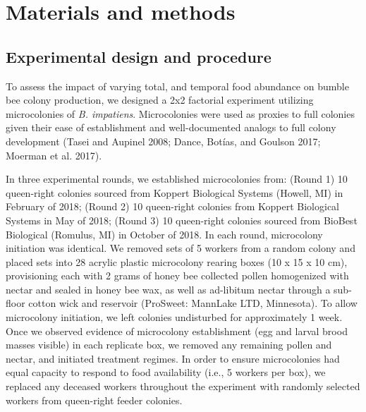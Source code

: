 \documentclass[11pt,]{article}
\begin{document}
\hypertarget{materials-and-methods}{%
\section{Materials and methods}\label{materials-and-methods}}

\hypertarget{experimental-design-and-procedure}{%
\subsection{Experimental design and
procedure}\label{experimental-design-and-procedure}}

To assess the impact of varying total, and temporal food abundance on
bumble bee colony production, we designed a 2x2 factorial experiment
utilizing microcolonies of \emph{B. impatiens}. Microcolonies were used
as proxies to full colonies given their ease of establishment and
well-documented analogs to full colony development (Tasei and Aupinel
2008; Dance, Botías, and Goulson 2017; Moerman et al. 2017).

In three experimental rounds, we established microcolonies from: (Round
1) 10 queen-right colonies sourced from Koppert Biological Systems
(Howell, MI) in February of 2018; (Round 2) 10 queen-right colonies from
Koppert Biological Systems in May of 2018; (Round 3) 10 queen-right
colonies sourced from BioBest Biological (Romulus, MI) in October of
2018. In each round, microcolony initiation was identical. We removed
sets of 5 workers from a random colony and placed sets into 28 acrylic
plastic microcolony rearing boxes (10 x 15 x 10 cm), provisioning each
with 2 grams of honey bee collected pollen homogenized with nectar and
sealed in honey bee wax, as well as ad-libitum nectar through a
sub-floor cotton wick and reservoir (ProSweet: MannLake LTD, Minnesota).
To allow microcolony initiation, we left colonies undisturbed for
approximately 1 week. Once we observed evidence of microcolony
establishment (egg and larval brood masses visible) in each replicate
box, we removed any remaining pollen and nectar, and initiated treatment
regimes. In order to ensure microcolonies had equal capacity to respond
to food availability (i.e., 5 workers per box), we replaced any deceased
workers throughout the experiment with randomly selected workers from
queen-right feeder colonies.
\end{document}
